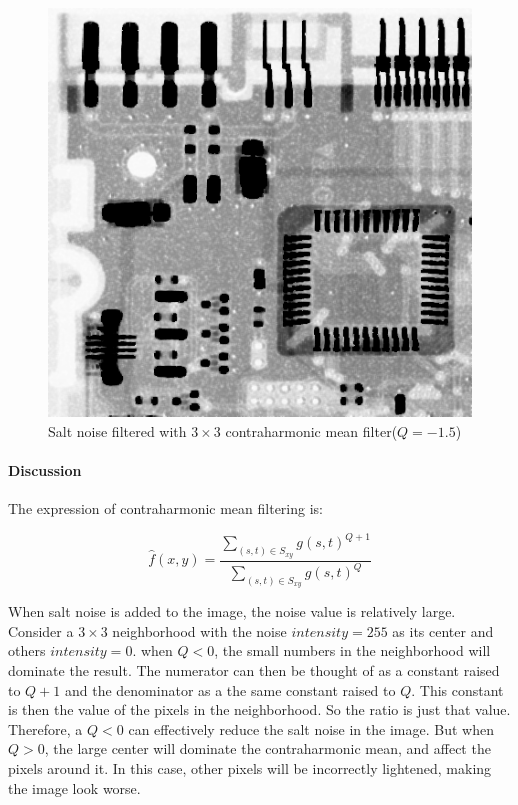 \documentclass{article}
\begin{document}
\begin{figure}[H]
	\centering
	\includegraphics[width=336pt]{../result/task2/salt/salt-contraharmonic--1-5.png}
	\caption{Salt noise filtered with $3 \times 3$ contraharmonic mean filter($Q = -1.5$)}
	\label{fig:saltchmneg}
\end{figure}

\paragraph{Discussion}
The expression of contraharmonic mean filtering is:

$$
\hat{f}(x, y) = \frac{\sum_{(s, t)\in S_{xy}} g(s, t)^{Q+1}}{\sum_{(s, t)\in S_{xy}} g(s, t)^Q}
$$

When salt noise is added to the image, the noise value is relatively large. Consider a $3 \times 3$ neighborhood with the noise $intensity = 255$ as its center and others $intensity = 0$. when $Q < 0$, the small numbers in the neighborhood will dominate the result. The numerator can then be thought of as a constant raised to $Q + 1$ and the denominator as a the same constant raised to $Q$. This constant is then the value of the pixels in the neighborhood. So the ratio is just that value. Therefore, a $Q < 0$ can effectively reduce the salt noise in the image. But when $Q > 0$, the large center will dominate the contraharmonic mean, and affect the pixels around it. In this case, other pixels will be incorrectly lightened, making the image look worse.
\end{document}
